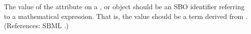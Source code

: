 The value of the attribute  on a \AlgebraicRule, \RateRule
or \AssignmentRule object should be an SBO identifier referring to a
mathematical expression.  That is, the value should be a term derived from
\sbomathformula.  (References: SBML .)
